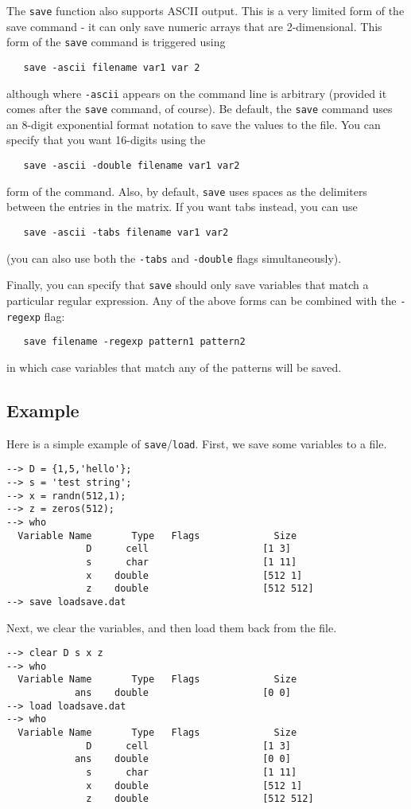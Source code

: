 The \verb|save| function also supports ASCII output.  This is a very limited
form of the save command - it can only save numeric arrays that are
2-dimensional.  This form of the \verb|save| command is triggered using
\begin{verbatim}
   save -ascii filename var1 var 2
\end{verbatim}
although where \verb|-ascii| appears on the command line is arbitrary (provided
it comes after the \verb|save| command, of course).  Be default, the \verb|save|
command uses an 8-digit exponential format notation to save the values to
the file.  You can specify that you want 16-digits using the
\begin{verbatim}
   save -ascii -double filename var1 var2
\end{verbatim}
form of the command.  Also, by default, \verb|save| uses spaces as the 
delimiters between the entries in the matrix.  If you want tabs instead,
you can use
\begin{verbatim}
   save -ascii -tabs filename var1 var2
\end{verbatim}
(you can also use both the \verb|-tabs| and \verb|-double| flags simultaneously).

Finally, you can specify that \verb|save| should only save variables that
match a particular regular expression.  Any of the above forms can be
combined with the \verb|-regexp| flag:
\begin{verbatim}
   save filename -regexp pattern1 pattern2
\end{verbatim}
in which case variables that match any of the patterns will be saved.
\subsection{Example}

Here is a simple example of \verb|save|/\verb|load|.  First, we save some 
variables to a file.
\begin{verbatim}
--> D = {1,5,'hello'};
--> s = 'test string';
--> x = randn(512,1);
--> z = zeros(512);
--> who
  Variable Name       Type   Flags             Size
              D      cell                    [1 3]
              s      char                    [1 11]
              x    double                    [512 1]
              z    double                    [512 512]
--> save loadsave.dat
\end{verbatim}
Next, we clear the variables, and then load them back from the file.
\begin{verbatim}
--> clear D s x z
--> who
  Variable Name       Type   Flags             Size
            ans    double                    [0 0]
--> load loadsave.dat
--> who
  Variable Name       Type   Flags             Size
              D      cell                    [1 3]
            ans    double                    [0 0]
              s      char                    [1 11]
              x    double                    [512 1]
              z    double                    [512 512]
\end{verbatim}
